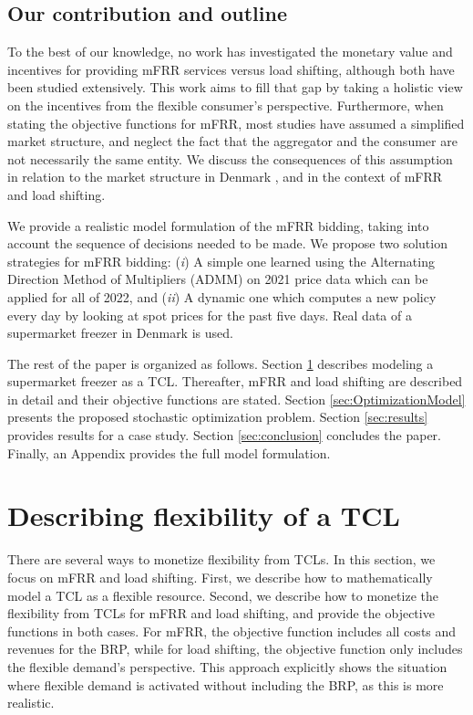 \documentclass[11pt,a4paper]{article}
\begin{document}
\subsection{Our contribution and outline}
%
To the best of our knowledge, no work has investigated the monetary value and incentives for providing mFRR services versus load shifting, although both have been studied extensively. This work aims to fill that gap by taking a holistic view on the incentives from the flexible consumer's perspective. Furthermore, when stating the objective functions for mFRR, most studies have assumed a simplified market structure, and neglect the fact that the aggregator and the consumer are not necessarily the same entity. We discuss the consequences of this assumption in relation to the market structure in Denmark \cite{gade2022ecosystem}, and in the context of mFRR and load shifting.

We provide a realistic model formulation of the mFRR bidding, taking into account the sequence of decisions needed to be made. We propose two solution strategies for mFRR bidding: (\textit{i}) A simple one learned using the Alternating Direction Method of Multipliers (ADMM) on 2021 price data which can be applied for all of 2022, and (\textit{ii}) A dynamic one which computes a new policy every day by looking at spot prices for the past five days. Real data of a supermarket freezer  in Denmark is used.


The rest of the paper is organized as follows. Section \ref{sec:monetizing_flex} describes modeling a supermarket freezer as a TCL. Thereafter, mFRR and load shifting are described in detail and their objective functions are stated. Section \ref{sec:OptimizationModel} presents the proposed stochastic optimization problem.
Section \ref{sec:results} provides  results for a case study. Section \ref{sec:conclusion} concludes the paper. Finally, an Appendix provides the full model formulation.

\section{Describing flexibility of a TCL}\label{sec:monetizing_flex}

There are several ways to monetize flexibility from TCLs. In this section, we focus on mFRR and load shifting. First, we describe how to mathematically model a TCL as a flexible resource. Second, we describe how to monetize the flexibility from TCLs for mFRR and load shifting, and provide the objective functions in both cases. For mFRR, the objective function includes all costs and revenues for the BRP, while for load shifting, the objective function only includes the flexible demand's perspective. This approach explicitly shows the situation where flexible demand is activated without including the BRP, as this is more realistic.
\end{document}
